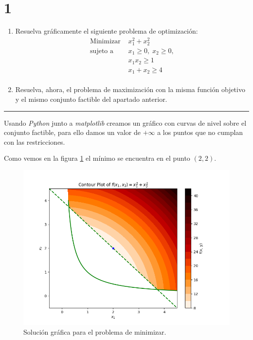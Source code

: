\section*{1}

\begin{enumerate}[label=\Alph*]
    
\item Resuelva gráficamente el siguiente problema de optimización:
        \begin{equation*}
        \begin{aligned}
            \text{Minimizar }   & x_1^2 + x_2^2 \\
            \text{sujeto a }    & x_1 \geq 0,\; x_2 \geq 0, \\
                                & x_1 x_2 \geq 1 \\
                                & x_1 + x_2 \geq 4 \\
        \end{aligned}
        \end{equation*}

\item Resuelva, ahora, el problema de maximización con la misma función objetivo y el mismo conjunto factible del apartado anterior. 

\end{enumerate}

\noindent\rule{10cm}{0.4pt}

Usando \textit{Python} junto a \textit{matplotlib} creamos un gráfico con curvas de nivel sobre el conjunto factible,
para ello damos un valor de $+\infty$ a los puntos que no cumplan con las restricciones.

Como vemos en la figura \ref{ex0_min} el mínimo se encuentra en el punto $(2, 2)$.

\begin{figure}[h]
\centering
\includegraphics[scale=0.6]{ex0_min.png}
\caption{Solución gráfica para el problema de minimizar.}
\label{ex0_min}
\end{figure}


